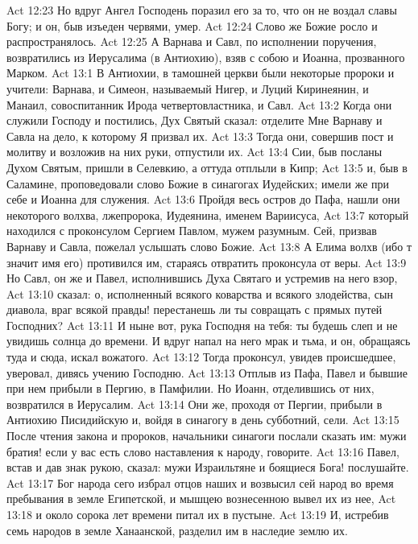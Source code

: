 \vs Act 12:23 Но вдруг Ангел Господень поразил его за то, что он не воздал славы Богу; и он, быв изъеден червями, умер.
\rsbpar\vs Act 12:24 Слово же Божие росло и распространялось.
\vs Act 12:25 А Варнава и Савл, по исполнении поручения, возвратились из Иерусалима (в Антиохию), взяв с собою и Иоанна, прозванного Марком.
\vs Act 13:1 В Антиохии, в тамошней церкви были некоторые пророки и учители: Варнава, и Симеон, называемый Нигер, и Луций Киринеянин, и Манаил, совоспитанник Ирода четвертовластника, и Савл.
\vs Act 13:2 Когда они служили Господу и постились, Дух Святый сказал: отделите Мне Варнаву и Савла на дело, к которому Я призвал их.
\vs Act 13:3 Тогда они, совершив пост и молитву и возложив на них руки, отпустили их.
\rsbpar\vs Act 13:4 Сии, быв посланы Духом Святым, пришли в Селевкию, а оттуда отплыли в Кипр;
\vs Act 13:5 и, быв в Саламине, проповедовали слово Божие в синагогах Иудейских; имели же при себе и Иоанна для служения.
\vs Act 13:6 Пройдя весь остров до Пафа, нашли они некоторого волхва, лжепророка, Иудеянина, именем Вариисуса,
\vs Act 13:7 который находился с проконсулом Сергием Павлом, мужем разумным. Сей, призвав Варнаву и Савла, пожелал услышать слово Божие.
\vs Act 13:8 А Елима волхв (ибо т значит имя его) противился им, стараясь отвратить проконсула от веры.
\vs Act 13:9 Но Савл, он же и Павел, исполнившись Духа Святаго и устремив на него взор,
\vs Act 13:10 сказал: о, исполненный всякого коварства и всякого злодейства, сын диавола, враг всякой правды! перестанешь ли ты совращать с прямых путей Господних?
\vs Act 13:11 И ныне вот, рука Господня на тебя: ты будешь слеп и не увидишь солнца до времени. И вдруг напал на него мрак и тьма, и он, обращаясь туда и сюда, искал вожатого.
\vs Act 13:12 Тогда проконсул, увидев происшедшее, уверовал, дивясь учению Господню.
\rsbpar\vs Act 13:13 Отплыв из Пафа, Павел и бывшие при нем прибыли в Пергию, в Памфилии. Но Иоанн, отделившись от них, возвратился в Иерусалим.
\vs Act 13:14 Они же, проходя от Пергии, прибыли в Антиохию Писидийскую и, войдя в синагогу в день субботний, сели.
\vs Act 13:15 После чтения закона и пророков, начальники синагоги послали сказать им: мужи братия! если у вас есть слово наставления к народу, говорите.
\rsbpar\vs Act 13:16 Павел, встав и дав знак рукою, сказал: мужи Израильтяне и боящиеся Бога! послушайте.
\vs Act 13:17 Бог народа сего избрал отцов наших и возвысил сей народ во время пребывания в земле Египетской, и мышцею вознесенною вывел их из нее,
\vs Act 13:18 и около сорока лет времени питал их в пустыне.
\vs Act 13:19 И, истребив семь народов в земле Ханаанской, разделил им в наследие землю их.
